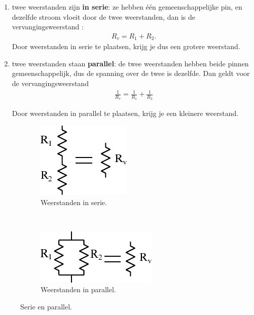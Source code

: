 \documentclass{article}
\begin{document}
			\begin{enumerate}
				\item twee weerstanden zijn \textbf{in serie}: ze hebben \'e\'en gemeenschappelijke pin, en dezelfde stroom vloeit door de twee weerstanden, dan is de vervangingsweerstand :
				\begin{align}
					R_{v} = R_1 + R_2.
				\end{align}
				Door weerstanden in serie te plaatsen, krijg je dus een grotere weerstand.

				\item twee weerstanden staan \textbf{parallel}: de twee weerstanden hebben beide pinnen gemeenschappelijk, dus de spanning over de twee is dezelfde. Dan geldt voor de vervangingsweerstand 
				\begin{align}
					\frac{1}{R_{v}}= \frac{1}{R_{1}} + \frac{1}{R_{2}} 
				\end{align}

				Door weerstanden in parallel te plaatsen, krijg je een kleinere weerstand.
			\end{enumerate}

			\begin{figure}[hbtp]
				\centering
				\begin{subfigure}[b]{0.45\linewidth}
					\centering
					\includegraphics{serie}
					\caption{Weerstanden in serie.}
					\label{subfig:serie}
				\end{subfigure}
				~
				\begin{subfigure}[b]{0.45\linewidth}
					\centering
					\includegraphics{parallel}
					\caption{Weerstanden in parallel.}
					\label{subfig:parallel}
				\end{subfigure}
				\caption{Serie en parallel.}
				\label{fig:serie_en_parallel}
			\end{figure}
\end{document}
